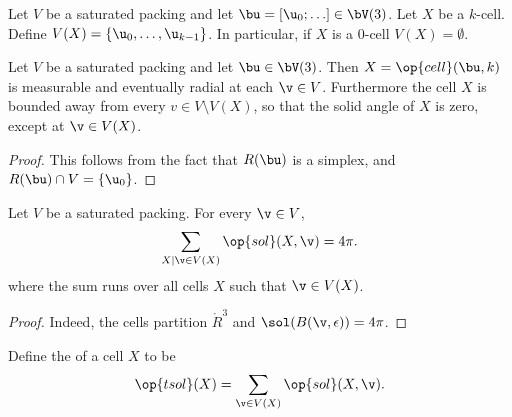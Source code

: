 \begin{definition}
  Let $V$ be a saturated packing and let $\bu=[\u_0;\ldots]\in
  \bV(3)$.  Let $X$ be a $k$-cell.  Define $V(X) =
  \{\u_0,\ldots,\u_{k-1}\}$.  In particular, if $X$ is a $0$-cell
  $V(X)=\emptyset$.
\end{definition}


\begin{lemma}\label{lemma:cell-radial}
  Let $V$ be a saturated packing and let $\bu\in \bV(3)$.  Then
  $X=\op{cell}(\bu,k)$ is measurable and eventually radial at each
  $\v\in V$.  Furthermore the cell $X$ is bounded away from every
  $v\in V\setminus V(X)$, so that the solid angle of $X$ is zero, except
  at $\v\in V(X)$.
\end{lemma}

\begin{proof} This follows from the fact that $R(\bu)$ is a simplex, and
$R(\bu)\cap V = \{\u_0\}$.
\end{proof}



\begin{lemma}
Let $V$ be a saturated packing.  For every $\v\in V$, 
\[
\sum_{X\mid \v\in V(X)}  \op{sol}(X,\v) = 4\pi.
\]
where the sum runs over all cells $X$ such that $\v\in V(X)$.
\end{lemma}

\begin{proof}  Indeed, the cells partition $\ring{R}^3$ and $\sol(B(\v,\epsilon)) = 4\pi$.
\end{proof}

\begin{definition}[$\op{tsol}$] 
  Define
  the  of a cell $X$ to be
\begin{displaymath} 
\op{tsol}(X) = \sum_{\v \in V(X) } \op{sol}(X,\v).
\end{displaymath}
\end{definition}
%
%
%

